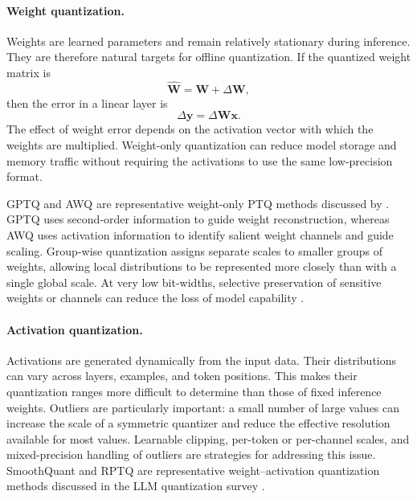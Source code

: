 \paragraph{Weight quantization.}
Weights are learned parameters and remain relatively stationary during
inference. They are therefore natural targets for offline quantization.
If the quantized weight matrix is
\begin{equation}
    \widehat{\mathbf{W}}
    =
    \mathbf{W}+\Delta\mathbf{W},
    \label{eq:quant-weight-error-model}
\end{equation}
then the error in a linear layer is
\begin{equation}
    \Delta\mathbf{y}
    =
    \Delta\mathbf{W}\mathbf{x}.
    \label{eq:quant-weight-error-output}
\end{equation}
The effect of weight error depends on the activation vector with which
the weights are multiplied. Weight-only quantization can reduce model
storage and memory traffic without requiring the activations to use the
same low-precision format.

GPTQ and AWQ are representative weight-only PTQ methods discussed by
\textcite{chen2026llmquantization}. GPTQ uses second-order information
to guide weight reconstruction, whereas AWQ uses activation information
to identify salient weight channels and guide scaling. Group-wise
quantization assigns separate scales to smaller groups of weights,
allowing local distributions to be represented more closely than with
a single global scale. At very low bit-widths, selective preservation
of sensitive weights or channels can reduce the loss of model
capability \parencite{chen2026llmquantization,song2026targetcentricqat}.

\paragraph{Activation quantization.}
Activations are generated dynamically from the input data. Their
distributions can vary across layers, examples, and token positions.
This makes their quantization ranges more difficult to determine than
those of fixed inference weights. Outliers are particularly important:
a small number of large values can increase the scale of a symmetric
quantizer and reduce the effective resolution available for most
values. Learnable clipping, per-token or per-channel scales, and
mixed-precision handling of outliers are strategies for addressing
this issue. SmoothQuant and RPTQ are representative weight--activation
quantization methods discussed in the LLM quantization survey
\parencite{chen2026llmquantization}.

